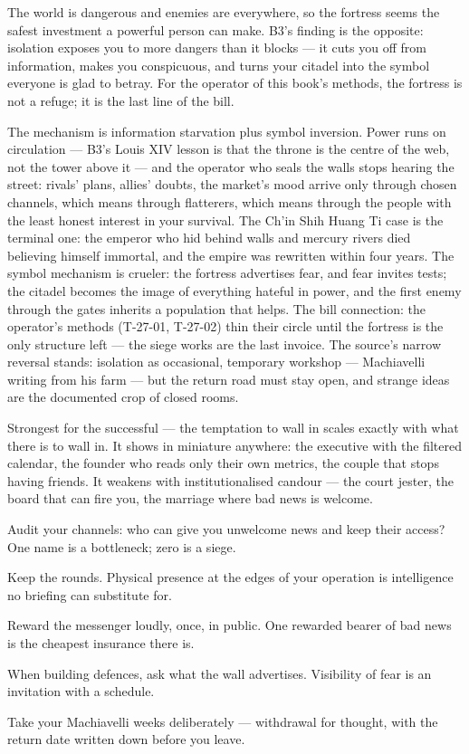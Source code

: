 \begin{core}
The world is dangerous and enemies are everywhere, so the fortress seems the safest investment a powerful person can make. B3's finding is the opposite: isolation exposes you to more dangers than it blocks --- it cuts you off from information, makes you conspicuous, and turns your citadel into the symbol everyone is glad to betray. For the operator of this book's methods, the fortress is not a refuge; it is the last line of the bill.
\end{core}
\begin{mechanism}
The mechanism is information starvation plus symbol inversion. Power runs on circulation --- B3's Louis XIV lesson is that the throne is the centre of the web, not the tower above it --- and the operator who seals the walls stops hearing the street: rivals' plans, allies' doubts, the market's mood arrive only through chosen channels, which means through flatterers, which means through the people with the least honest interest in your survival. The Ch'in Shih Huang Ti case is the terminal one: the emperor who hid behind walls and mercury rivers died believing himself immortal, and the empire was rewritten within four years. The symbol mechanism is crueler: the fortress advertises fear, and fear invites tests; the citadel becomes the image of everything hateful in power, and the first enemy through the gates inherits a population that helps. The bill connection: the operator's methods (T-27-01, T-27-02) thin their circle until the fortress is the only structure left --- the siege works are the last invoice. The source's narrow reversal stands: isolation as occasional, temporary workshop --- Machiavelli writing from his farm --- but the return road must stay open, and strange ideas are the documented crop of closed rooms.
\end{mechanism}
\begin{conditions}
Strongest for the successful --- the temptation to wall in scales exactly with what there is to wall in. It shows in miniature anywhere: the executive with the filtered calendar, the founder who reads only their own metrics, the couple that stops having friends. It weakens with institutionalised candour --- the court jester, the board that can fire you, the marriage where bad news is welcome.
\end{conditions}
\begin{application}
  \item Audit your channels: who can give you unwelcome news and keep their access? One name is a bottleneck; zero is a siege.
  \item Keep the rounds. Physical presence at the edges of your operation is intelligence no briefing can substitute for.
  \item Reward the messenger loudly, once, in public. One rewarded bearer of bad news is the cheapest insurance there is.
  \item When building defences, ask what the wall advertises. Visibility of fear is an invitation with a schedule.
  \item Take your Machiavelli weeks deliberately --- withdrawal for thought, with the return date written down before you leave.
\end{application}
